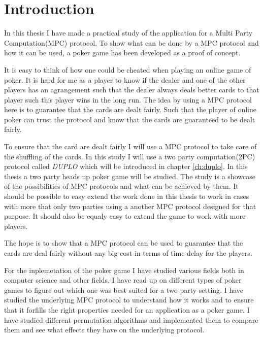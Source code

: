 \documentclass[twoside,11pt,openright]{report}
\newcommand{\DUPLO}{\textit{DUPLO} }
\begin{document}
\tableofcontents
{}
\setcounter{secnumdepth}{2}

\chapter{Introduction}
\label{ch:intro}
In this thesis I have made a practical study of the application for a Multi Party Computation(MPC) protocol. To show what can be done by a MPC protocol and how it can be used, a poker game has been developed as a proof of concept.

It is easy to think of how one could be cheated when playing an online game of poker. It is hard for me as a player to know if the dealer and one of the other players has an agrangement such that the dealer always deals better cards to that player such this player wins in the long run. The idea by using a MPC protocol here is to guarantee that the cards are dealt fairly. Such that the player of online poker can trust the protocol and know that the cards are guaranteed to be dealt fairly.

To ensure that the card are dealt fairly I will use a MPC protocol to take care of the shuffling of the cards. In this study I will use a two party computation(2PC) protocol called \DUPLO which will be introduced in chapter \ref{ch:duplo}. In this thesis a two party heads up poker game will be studied. The study is a showcase of the possibilities of MPC protocols and what can be achieved by them. It should be possible to easy extend the work done in this thesis to work in cases with more that only two parties using a another MPC protocol designed for that purpose. It should also be equaly easy to extend the game to work with more players.

The hope is to show that a MPC protocol can be used to guarantee that the cards are deal fairly without any big cost in terms of time delay for the players.

\bigskip

For the inplemetation of the poker game I have studied various fields both in computer science and other fields. I have read up on different types of poker games to figure out which one was best suited for a two party setting. I have studied the underlying MPC protocol to understand how it works and to ensure that it forfills the right properties needed for an application as a poker game. I have studied different permutation algorithms and implemented them to compare them and see what effects they have on the underlying protocol.
\end{document}
